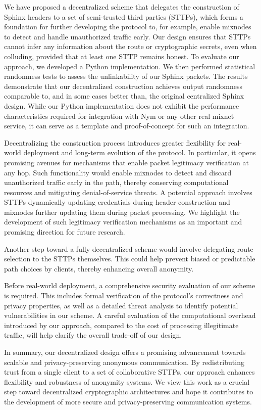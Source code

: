 We have proposed a decentralized scheme that delegates the construction of Sphinx headers to a set of semi-trusted third parties (STTPs), which forms a foundation for further developing the protocol to, for example, enable mixnodes to detect and handle unauthorized traffic early.
Our design ensures that STTPs cannot infer any information about the route or cryptographic secrets, even when colluding, provided that at least one STTP remains honest.
To evaluate our approach, we developed a Python implementation. 
We then performed statistical randomness tests to assess the unlinkability of our Sphinx packets.
The results demonstrate that our decentralized construction achieves output randomness comparable to, and in some cases better than, the original centralized Sphinx design.
While our Python implementation does not exhibit the performance characteristics required for integration with Nym or any other real mixnet service, it can serve as a template and proof-of-concept for such an integration.

Decentralizing the construction process introduces greater flexibility for real-world deployment and long-term evolution of the protocol.
In particular, it opens promising avenues for mechanisms that enable packet legitimacy verification at any hop.
Such functionality would enable mixnodes to detect and discard unauthorized traffic early in the path, thereby conserving computational resources and mitigating denial-of-service threats. 
A potential approach involves STTPs dynamically updating credentials during header construction and mixnodes further updating them during packet processing.
We highlight the development of such legitimacy verification mechanisms as an important and promising direction for future research.

Another step toward a fully decentralized scheme would involve delegating route selection to the STTPs themselves.
This could help prevent biased or predictable path choices by clients, thereby enhancing overall anonymity.

Before real-world deployment, a comprehensive security evaluation of our scheme is required. 
This includes formal verification of the protocol's correctness and privacy properties, as well as a detailed threat analysis to identify potential vulnerabilities in our scheme. 
A careful evaluation of the computational overhead introduced by our approach, compared to the cost of processing illegitimate traffic, will help clarify the overall trade-off of our design.

In summary, our decentralized design offers a promising advancement towards scalable and privacy-preserving anonymous communication.
By redistributing trust from a single client to a set of collaborative STTPs, our approach enhances flexibility and robustness of anonymity systems.
We view this work as a crucial step toward decentralized cryptographic architectures and hope it contributes to the development of more secure and privacy-preserving communication systems.



